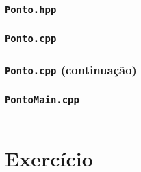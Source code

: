 \documentclass[aspectratio=169]{beamer}
\begin{document}
\begin{frame}[fragile]\frametitle{\texttt{Ponto.hpp}}
\fontsize{6pt}{6pt}\selectfont{

}
\end{frame}

\begin{frame}[fragile]\frametitle{\texttt{Ponto.cpp}}
\fontsize{6pt}{6pt}\selectfont{

}
\end{frame}

\begin{frame}[fragile]\frametitle{\texttt{Ponto.cpp} (continuação)}
\fontsize{6pt}{6pt}\selectfont{

}
\end{frame}

\begin{frame}[fragile]\frametitle{\texttt{PontoMain.cpp}}
\begin{columns}
\begin{column}{0.5\linewidth}
\fontsize{6pt}{6pt}\selectfont{

}
\end{column}
\begin{column}{0.5\linewidth}
\fontsize{6pt}{6pt}\selectfont{

}
\end{column}
\end{columns}
\end{frame}

\section{Exercício}
\end{document}
